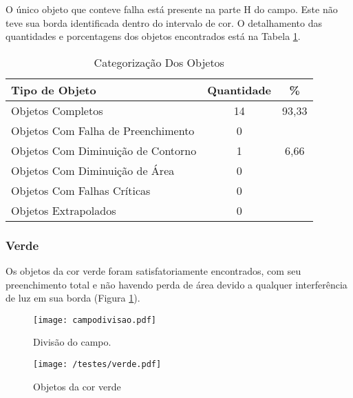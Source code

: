O único objeto que conteve falha está presente na parte H do campo. Este não teve sua borda identificada dentro do intervalo de cor. O detalhamento das quantidades e porcentagens dos objetos encontrados está na Tabela \ref{tab:azul}.
\begin{table}[H]
\centering
\begin{tabular}{l|c|c}
Tipo de Objeto & Quantidade & \% \\ %
\hline                               %
Objetos Completos & 14 & 93,33 \\
\hline 
Objetos Com Falha de Preenchimento & 0\\
\hline 
Objetos Com Diminuição de Contorno &  1 & 6,66
\\
\hline 
Objetos Com Diminuição de Área & 0 \\
\hline 
Objetos Com Falhas Críticas & 0 \\
\hline \hline 
Objetos Extrapolados &  0\\
\hline 
\end{tabular}
\caption{Categorização Dos Objetos}
\label{tab:azul}
\end{table}
\newpage
\subsubsection{Verde}
Os objetos da cor verde foram satisfatoriamente encontrados, com seu preenchimento total e não havendo perda de área devido a qualquer interferência de luz em sua borda (Figura \ref{fig:verde}).	

	\begin{figure}[H]
		\begin{minipage}[b]{0.45\linewidth}
			\centering
			\texttt{[image: campodivisao.pdf]}
			\caption{Divisão do campo.}				
		\end{minipage}
		\hspace{0.5cm}
		\begin{minipage}[b]{0.45\linewidth}
			\centering
			\texttt{[image: /testes/verde.pdf]}
			\caption{Objetos da cor verde}
			\label{fig:verde}
		\end{minipage}
	\end{figure}


